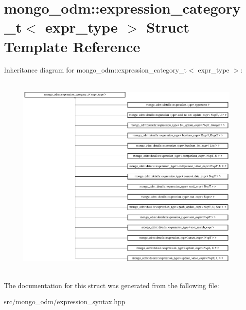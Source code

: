 \hypertarget{structmongo__odm_1_1expression__category__t}{}\section{mongo\+\_\+odm\+:\+:expression\+\_\+category\+\_\+t$<$ expr\+\_\+type $>$ Struct Template Reference}
\label{structmongo__odm_1_1expression__category__t}
Inheritance diagram for mongo\+\_\+odm\+:\+:expression\+\_\+category\+\_\+t$<$ expr\+\_\+type $>$\+:\begin{figure}[H]
\begin{center}
\leavevmode
\includegraphics[height=10.347826cm]{structmongo__odm_1_1expression__category__t}
\end{center}
\end{figure}


The documentation for this struct was generated from the following file\+:\begin{DoxyCompactItemize}
\item 
src/mongo\+\_\+odm/expression\+\_\+syntax.\+hpp\end{DoxyCompactItemize}
